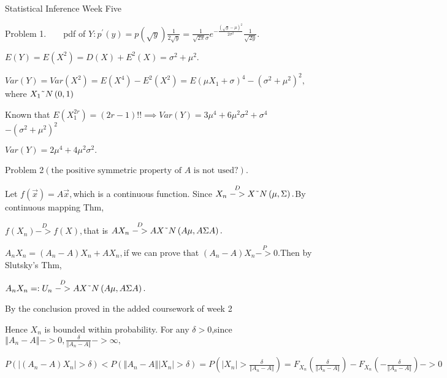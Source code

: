 \documentclass{article}
\begin{document}
Statistical Inference Week Five


Problem 1.$\qquad $pdf of $Y:p^{\prime }\left( y\right) =p\left( \sqrt{y}%
\right) \frac{1}{2\sqrt{y}}=\frac{1}{\sqrt{2\pi }\sigma }e^{-\frac{\left( 
\sqrt{y}-\mu \right) ^{2}}{2\sigma ^{2}}}\frac{1}{\sqrt{2y}}.$

$E\left( Y\right) =E\left( X^{2}\right) =D\left( X\right) +E^{2}\left(
X\right) =\sigma ^{2}+\mu ^{2}.$

$Var\left( Y\right) =Var\left( X^{2}\right) =E\left( X^{4}\right)
-E^{2}\left( X^{2}\right) =E\left( \mu X_{1}+\sigma \right) ^{4}-\left(
\sigma ^{2}+\mu ^{2}\right) ^{2},$where $X_{1}\symbol{126}N\left( 0,1\right) 
$

Known that $E\left( X_{1}^{2r}\right) =\left( 2r-1\right) !!\implies
Var\left( Y\right) =3\mu ^{4}+6\mu ^{2}\sigma ^{2}+\sigma ^{4}$ $-\left(
\sigma ^{2}+\mu ^{2}\right) ^{2}$

$Var\left( Y\right) =2\mu ^{4}+4\mu ^{2}\sigma ^{2}.$

Problem 2$\left( \text{the positive symmetric property of }A\text{ is not
used?}\right) $.%

\bigskip Let $f\left( \vec{x}\right) =A\vec{x},$which is a continuous
function. Since $X_{n}\overset{D}{->}X\symbol{126}N\left( \mu ,\Sigma
\right) .$By continuous mapping Thm,

$f\left( X_{n}\right) \overset{D}{->}f\left( X\right) ,$that is $AX_{n}%
\overset{D}{->}AX\symbol{126}N\left( A\mu ,A\Sigma A\right) .$

$A_{n}X_{n}=\left( A_{n}-A\right) X_{n}+AX_{n},$if we can prove that $\left(
A_{n}-A\right) X_{n}\overset{P}{->}0.$Then by Slutsky's Thm,

$A_{n}X_{n}=:U_{n}\overset{D}{->}AX\symbol{126}N\left( A\mu ,A\Sigma
A\right) .$

By the conclusion proved in the added coursework of week 2


Hence $X_{n}$ is bounded within probability. For any $\delta >0$,since $%
\left\Vert A_{n}-A\right\Vert ->0,\frac{\delta }{\left\Vert
A_{n}-A\right\Vert }->\infty ,$

$P\left( \left\vert \left( A_{n}-A\right) X_{n}\right\vert >\delta \right)
<P\left( \left\Vert A_{n}-A\right\Vert \left\vert X_{n}\right\vert >\delta
\right) =P\left( \left\vert X_{n}\right\vert >\frac{\delta }{\left\Vert
A_{n}-A\right\Vert }\right) =F_{X_{n}}\left( \frac{\delta }{\left\Vert
A_{n}-A\right\Vert }\right) -F_{X_{n}}\left( -\frac{\delta }{\left\Vert
A_{n}-A\right\Vert }\right) ->0$
\end{document}
